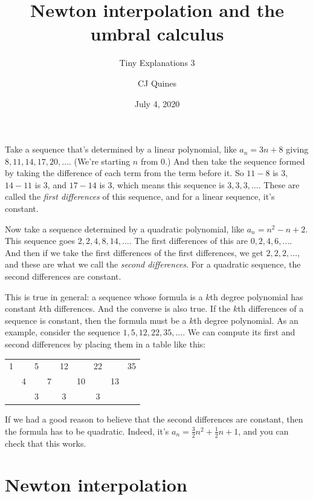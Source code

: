 \documentclass[11pt,paper=letter]{scrartcl}
\begin{document}
\title{Newton interpolation and the umbral calculus}
\subtitle{Tiny Explanations 3}
\author{CJ Quines}
\date{July 4, 2020}

\maketitle

\renewcommand{\thetitle}{Newton interpolation}

Take a sequence that's determined by a linear polynomial, like $a_n = 3n + 8$ giving $8, 11, 14, 17, 20, \ldots$. (We're starting $n$ from $0$.) And then take the sequence formed by taking the difference of each term from the term before it. So $11 - 8$ is $3$, $14 - 11$ is $3$, and $17 - 14$ is $3$, which means this sequence is $3, 3, 3, \ldots$. These are called the \textit{first differences} of this sequence, and for a linear sequence, it's constant.

Now take a sequence determined by a quadratic polynomial, like $a_n = n^2 - n + 2$. This sequence goes $2, 2, 4, 8, 14, \ldots$. The first differences of this are $0, 2, 4, 6, \ldots$. And then if we take the first differences of the first differences, we get $2, 2, 2, \ldots$, and these are what we call the \textit{second differences}. For a quadratic sequence, the second differences are constant.

This is true in general: a sequence whose formula is a $k$th degree polynomial has constant $k$th differences. And the converse is also true. If the $k$th differences of a sequence is constant, then the formula must be a $k$th degree polynomial. As an example, consider the sequence $1, 5, 12, 22, 35, \ldots$. We can compute its first and second differences by placing them in a table like this:

\begin{center}
\begin{tabular}{ccccccccc}
1 &   & 5 &   & 12 &    & 22 &    & 35 \\
  & 4 &   & 7 &    & 10 &    & 13 & \\
  &   & 3 &   & 3  &    & 3  &    &
\end{tabular}
\end{center}

If we had a good reason to believe that the second differences are constant, then the formula has to be quadratic. Indeed, it's $a_n = \frac{3}{2}n^2 + \frac{1}{2}n + 1$, and you can check that this works.

\section{Newton interpolation}
\end{document}
